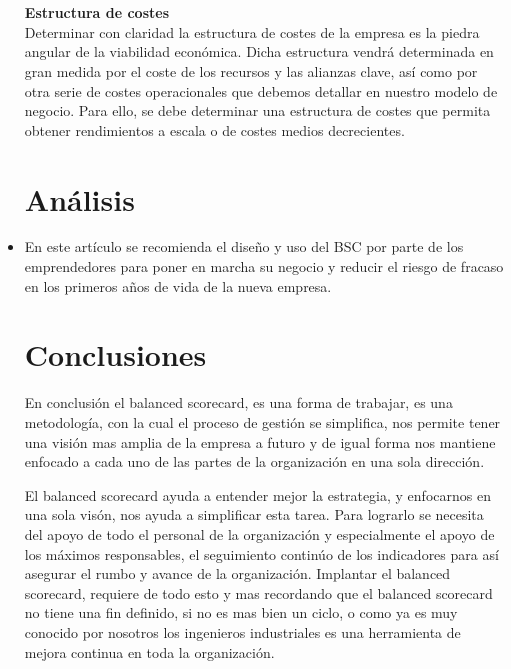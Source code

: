 \documentclass[twoside,twocolumn]{article}
\begin{document}
\begin{flushright}
\begin{itemize}
\textbf{}\\\textbf{}\\
\textbf{Estructura de costes}\\
Determinar con claridad la estructura de costes de la empresa es la piedra angular de la viabilidad económica. Dicha estructura vendrá determinada en gran medida por el coste de los recursos y las alianzas clave, así como por otra serie de costes operacionales que debemos detallar en nuestro modelo de negocio. Para ello, se debe determinar una estructura de costes que permita obtener rendimientos a escala o de costes medios decrecientes.

\section{Análisis}
\item En este artículo se recomienda el diseño y uso del BSC por parte de los emprendedores para poner en marcha su negocio y reducir el riesgo de fracaso en los primeros años de vida de la nueva empresa.



\section{Conclusiones}
En conclusión el balanced scorecard, es una forma de trabajar, es una metodología, con la cual el proceso de gestión se simplifica, nos permite tener una visión mas amplia de la empresa a futuro y de igual forma nos mantiene enfocado a cada uno de las partes de la organización en una sola dirección.\newline

El balanced scorecard ayuda a entender mejor la estrategia, y enfocarnos en una sola visón, nos ayuda a simplificar esta tarea.
Para lograrlo se necesita del apoyo de todo el personal de la organización y especialmente el apoyo de los máximos responsables, el seguimiento continúo de los indicadores para así asegurar el rumbo y avance de la organización.
Implantar el balanced scorecard, requiere de todo esto y mas recordando que el balanced scorecard no tiene una fin definido, si no es mas bien un ciclo, o como ya es muy conocido por nosotros los ingenieros industriales es una herramienta de mejora continua en toda la organización.






\textbf{}\\
\textbf{}\\


\end{itemize}
\end{flushright}
\end{document}
